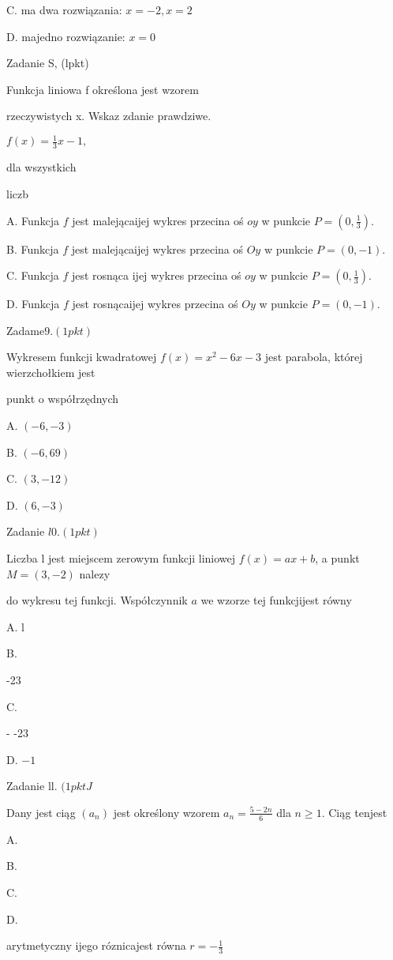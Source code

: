 \documentclass[a4paper,12pt]{article}
\begin{document}
C. ma dwa rozwiązania: $x=-2, x=2$

D. majedno rozwiązanie: $x=0$

Zadanie S, (lpkt)

Funkcja liniowa f określona jest wzorem

rzeczywistych x. Wskaz zdanie prawdziwe.

$f(x)=\displaystyle \frac{1}{3}x-1,$

dla wszystkich

liczb

A. Funkcja $f$ jest malejącaijej wykres przecina oś $oy$ w punkcie $P=(0,\displaystyle \frac{1}{3}).$

B. Funkcja $f$ jest malejącaijej wykres przecina oś $Oy$ w punkcie $P=(0,-1).$

C. Funkcja $f$ jest rosnąca ijej wykres przecina oś $oy$ w punkcie $P=(0,\displaystyle \frac{1}{3}).$

D. Funkcja $f$ jest rosnącaijej wykres przecina oś $Oy$ w punkcie $P=(0,-1).$

Zadam$\mathrm{e}9. (1pkt)$

Wykresem funkcji kwadratowej $f(x)=x^{2}-6x-3$ jest parabola, której wierzchołkiem jest

punkt o współrzędnych

A. $(-6,-3)$

B. $(-6,69)$

C. $(3,-12)$

D. $(6,-3)$

Zadanie $l0. (1pkt)$

Liczba l jest miejscem zerowym funkcji liniowej $f(x)=ax+b$, a punkt $M=(3,-2)$ nalezy

do wykresu tej funkcji. Współczynnik $a$ we wzorze tej funkcjijest równy

A. l

B.

-23

C.

- -23

D. $-1$

Zadanie ll. $(1pktJ$

Dany jest ciąg $(a_{n})$ jest określony wzorem $a_{n}=\displaystyle \frac{5-2n}{6}$ dla $n\geq 1$. Ciąg tenjest

A.

B.

C.

D.

arytmetyczny ijego róznicajest równa $r=-\displaystyle \frac{1}{3}$
\end{document}
